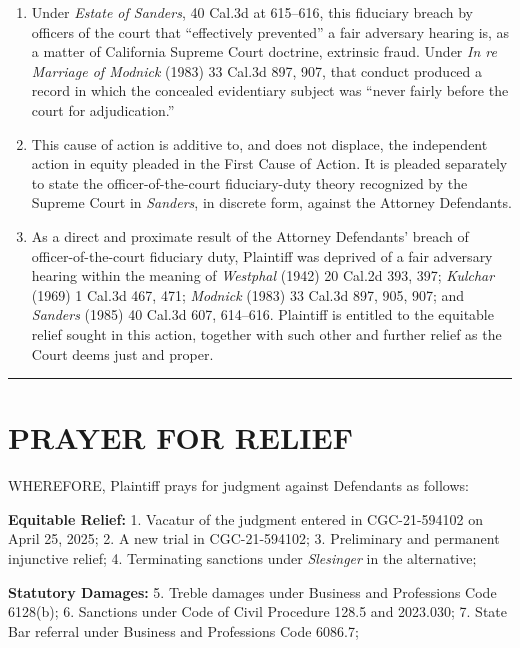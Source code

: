 \begin{enumerate}
\def\labelenumi{\arabic{enumi}.}
\setcounter{enumi}{84}
\item
  Under \emph{Estate of Sanders}, 40 Cal.3d at 615--616, this fiduciary breach by officers of the court that ``effectively prevented'' a fair adversary hearing is, as a matter of California Supreme Court doctrine, extrinsic fraud. Under \emph{In re Marriage of Modnick} (1983) 33 Cal.3d 897, 907, that conduct produced a record in which the concealed evidentiary subject was ``never fairly before the court for adjudication.''
\item
  This cause of action is additive to, and does not displace, the independent action in equity pleaded in the First Cause of Action. It is pleaded separately to state the officer-of-the-court fiduciary-duty theory recognized by the Supreme Court in \emph{Sanders}, in discrete form, against the Attorney Defendants.
\item
  As a direct and proximate result of the Attorney Defendants' breach of officer-of-the-court fiduciary duty, Plaintiff was deprived of a fair adversary hearing within the meaning of \emph{Westphal} (1942) 20 Cal.2d 393, 397; \emph{Kulchar} (1969) 1 Cal.3d 467, 471; \emph{Modnick} (1983) 33 Cal.3d 897, 905, 907; and \emph{Sanders} (1985) 40 Cal.3d 607, 614--616. Plaintiff is entitled to the equitable relief sought in this action, together with such other and further relief as the Court deems just and proper.
\end{enumerate}

\begin{center}\rule{0.5\linewidth}{0.5pt}\end{center}

\label{toc:prayer-for-relief}
\section{PRAYER FOR RELIEF}\label{prayer-for-relief}

WHEREFORE, Plaintiff prays for judgment against Defendants as follows:

\textbf{Equitable Relief:} 1. Vacatur of the judgment entered in CGC-21-594102 on April 25, 2025; 2. A new trial in CGC-21-594102; 3. Preliminary and permanent injunctive relief; 4. Terminating sanctions under \emph{Slesinger} in the alternative;

\textbf{Statutory Damages:} 5. Treble damages under Business and Professions Code \textsection{} 6128(b); 6. Sanctions under Code of Civil Procedure \textsection{}\textsection{} 128.5 and 2023.030; 7. State Bar referral under Business and Professions Code \textsection{} 6086.7;

